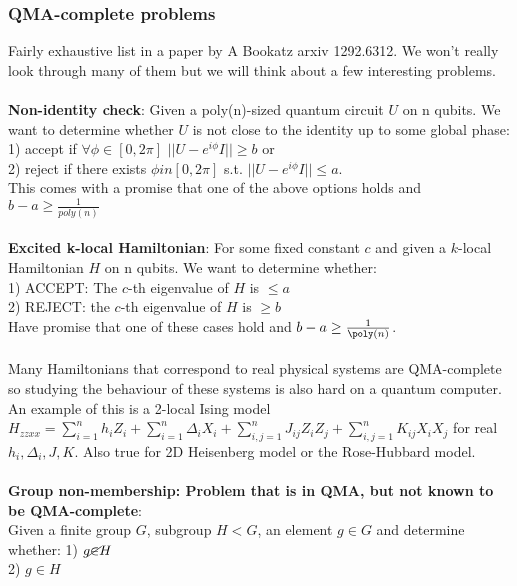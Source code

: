 \documentclass{article}
\begin{document}
\subsubsection{QMA-complete problems}
Fairly exhaustive list in a paper by A Bookatz arxiv 1292.6312. We won't really look through many of them but we will think about a few interesting problems.\\\\
\textbf{Non-identity check}: Given a poly(n)-sized quantum circuit $U$ on n qubits. We want to determine whether $U$ is not close to the identity up to some global phase:\\
1) accept if $\forall \phi \in [0,2\pi]$ $||U - e^{i \phi} I|| \geq b$ or\\
2) reject if there exists $\phi in [0, 2\pi]$ s.t. $|| U - e^{i \phi} I|| \leq a$.\\
This comes with a promise that one of the above options holds and $b- a \geq \frac{1}{poly(n)}$\\\\
\textbf{Excited k-local Hamiltonian}: For some fixed constant $c$ and given a $k$-local Hamiltonian $H$ on n qubits. We want to determine whether:\\
1) ACCEPT: The $c$-th eigenvalue of $H$ is $\leq a$\\
2) REJECT: the $c$-th eigenvalue of $H$ is $\geq b$\\
Have promise that one of these cases hold and $b-a \geq \frac{1}{\poly(n)}$.\\\\
Many Hamiltonians that correspond to real physical systems are QMA-complete so studying the behaviour of these systems is also hard on a quantum computer. An example of this is a 2-local Ising model $H_{zzxx} = \sum_{i=1}^n h_i Z_i + \sum_{i=1}^n \Delta_i X_i + \sum_{i,j=1}^n J_{ij} Z_i Z_j  + \sum_{i,j =1}^n K_{ij} X_i X_j$ for real $h_i, \Delta_i, J, K$. Also true for 2D Heisenberg model or the Rose-Hubbard model.\\\\
\textbf{Group non-membership: Problem that is in QMA, but not known to be QMA-complete}:\\
Given a finite group $G$, subgroup $H < G$, an element $g \in G$ and determine whether:
1) $g \cancel \in H$\\
2) $g \in H$\\
\end{document}
